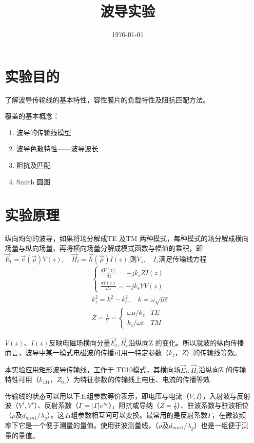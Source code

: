 \documentclass{../source/zjureport}
\title{波导实验}
\date{\today}
\begin{document}
    \makecover
    \makeheader

    \section{实验目的}
    了解波导传输线的基本特性，容性膜片的负载特性及阻抗匹配方法。

    覆盖的基本概念：
    \begin{enumerate}
        \item 波导的传输线模型
        \item 波导色散特性——波导波长
        \item 阻抗及匹配
        \item Smith 圆图
    \end{enumerate}

    \section{实验原理}

    纵向均匀的波导，如果将场分解成TE 及TM 两种模式，每种模式的场分解成横向场量与纵向场量，再将横向场量分解成模式函数与幅值的乘积，即$\vec{E}_{t}=\vec{e}(\vec{\rho}) V(z), \quad \vec{H}_{t}=\vec{h}(\vec{\rho}) I(z)$,则$V_{z},\quad I_{z}$满足传输线方程
    $$
\begin{aligned}
&\left\{\begin{array}{l}
\displaystyle \frac{d V(z)}{d z}=-j k_{s} Z I(z) \\
\displaystyle \frac{d I(z)}{d z}=-j k_{s} Y V(z)
\end{array}\right.\\
&k_{z}^{2}=k^{2}-k_{t}^{2}, \quad k=\omega \sqrt{\mu \varepsilon}\\
&Z=\displaystyle \frac{1}{Y}=\left\{\begin{array}{ll}
\omega \mu / k_{z} & T E \\
k_{z} / \omega \varepsilon & T M
\end{array}\right.
\end{aligned}
$$

$V(z)、I(z)$反映电磁场横向分量$\vec{E}_{t},\vec{H}_t$沿纵向Z 的变化。所以就波的纵向传播而言，波导中某一模式电磁波的传播可用一特定参数（$k_z，Z$）的传输线等效。

本实验应用矩形波导传输线，工作于 TE10模式，其横向场$\vec{E}_{t},\vec{H}_t$沿纵向Z
的传输特性可用（$k_{z01}，Z_{01}$）为特征参数的传输线上电压、电流的传播等效.

传输线的状态可以用以下五组参数等价表示，即电压与电流（$V,I$），入射波与反射波（$V^i,V^r$）、反射系数（$\Gamma=|\Gamma| e^{j \psi}$），阻抗或导纳（$Z = \displaystyle \frac{1}{Y}$）、驻波系数与驻波相位（$\rho$及$d_{min1}/\lambda_g$）。这五组参数相互间可以变换。最常用的是反射系数$\Gamma$，在微波频率下它是一个便于测量的量值。使用驻波测量线，（$\rho$及$d_{min1}/\lambda_g$）也是一组便于测量的量值。
\end{document}
